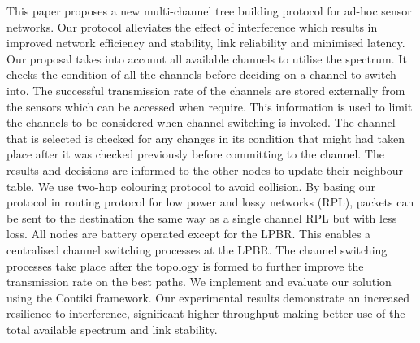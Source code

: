 This paper proposes a new multi-channel tree building protocol for ad-hoc sensor networks. %
Our protocol alleviates the effect of interference which results in improved network efficiency and stability, link reliability and minimised latency. 
        Our proposal takes into account all available channels to utilise the spectrum. It checks the condition of all the channels before deciding on a channel to switch into. The successful transmission rate of the channels are stored externally from the sensors which can be accessed when require. This information is used to limit the channels to be considered when channel switching is invoked. The channel that is selected is checked for any changes in its condition that might had taken place after it was checked previously before committing to the channel. The results and decisions are informed to the other nodes to update their neighbour table. We use two-hop colouring protocol to avoid collision. 
	By basing our protocol in routing protocol for low power and lossy networks (RPL), packets can be sent to the destination the same way as a single channel RPL but with less loss. 
	All nodes are battery operated except for the LPBR. This enables a centralised channel switching processes at the LPBR. The channel switching processes take place after the topology is formed to further improve the transmission rate on the best paths.
	We implement and evaluate our solution using the Contiki framework. Our experimental results demonstrate an increased resilience to interference, significant higher throughput making better use of the total available spectrum and link stability. 
